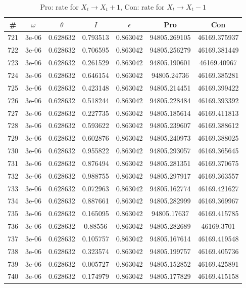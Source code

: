 \newpage
\begin{table}
\caption{Pro: rate for $X_t \rightarrow X_t + 1$, Con: rate for $X_t \rightarrow X_t - 1$}
\begin{tabular*}{\linewidth}{c|c|c|c|c|c|c}
\# & $\omega$ & $\theta$ & $I$ & $\epsilon$ & Pro & Con \\
\hline
721 & 3e-06 & 0.628632 & 0.793513 & 0.863042 & 94805.269105 & 46169.375937\\
722 & 3e-06 & 0.628632 & 0.706595 & 0.863042 & 94805.256279 & 46169.381449\\
723 & 3e-06 & 0.628632 & 0.261529 & 0.863042 & 94805.190601 & 46169.40967\\
724 & 3e-06 & 0.628632 & 0.646154 & 0.863042 & 94805.24736 & 46169.385281\\
725 & 3e-06 & 0.628632 & 0.423148 & 0.863042 & 94805.214451 & 46169.399422\\
726 & 3e-06 & 0.628632 & 0.518244 & 0.863042 & 94805.228484 & 46169.393392\\
727 & 3e-06 & 0.628632 & 0.227735 & 0.863042 & 94805.185614 & 46169.411813\\
728 & 3e-06 & 0.628632 & 0.593622 & 0.863042 & 94805.239607 & 46169.388612\\
729 & 3e-06 & 0.628632 & 0.602876 & 0.863042 & 94805.240973 & 46169.388025\\
730 & 3e-06 & 0.628632 & 0.955822 & 0.863042 & 94805.293057 & 46169.365645\\
731 & 3e-06 & 0.628632 & 0.876494 & 0.863042 & 94805.281351 & 46169.370675\\
732 & 3e-06 & 0.628632 & 0.988755 & 0.863042 & 94805.297917 & 46169.363557\\
733 & 3e-06 & 0.628632 & 0.072963 & 0.863042 & 94805.162774 & 46169.421627\\
734 & 3e-06 & 0.628632 & 0.887661 & 0.863042 & 94805.282999 & 46169.369967\\
735 & 3e-06 & 0.628632 & 0.165095 & 0.863042 & 94805.17637 & 46169.415785\\
736 & 3e-06 & 0.628632 & 0.88556 & 0.863042 & 94805.282689 & 46169.3701\\
737 & 3e-06 & 0.628632 & 0.105757 & 0.863042 & 94805.167614 & 46169.419548\\
738 & 3e-06 & 0.628632 & 0.323574 & 0.863042 & 94805.199757 & 46169.405736\\
739 & 3e-06 & 0.628632 & 0.005727 & 0.863042 & 94805.152852 & 46169.425891\\
740 & 3e-06 & 0.628632 & 0.174979 & 0.863042 & 94805.177829 & 46169.415158\\

\end{tabular*}
\end{table}
